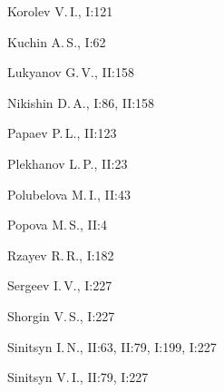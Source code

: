 \begin{theindex}
  \item Korolev V.\,I., I:121


  \item Kuchin A.\,S., I:62





  \indexspace





  \item Lukyanov G.\,V., II:158





  \indexspace





  \item Nikishin D.\,A., I:86, II:158





  \indexspace





  \item Papaev P.\,L., II:123


  \item Plekhanov L.\,P., II:23


  \item Polubelova M.\,I., II:43


  \item Popova M.\,S., II:4





  \indexspace





  \item Rzayev R.\,R., I:182





  \indexspace





  \item Sergeev I.\,V., I:227


  \item Shorgin V.\,S., I:227


  \item Sinitsyn I.\,N., II:63, II:79, I:199, I:227


  \item Sinitsyn V.\,I., II:79, I:227



\end{theindex}
